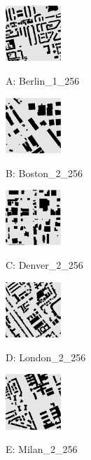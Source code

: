 \documentclass[letterpaper, 10 pt, journal, twoside]{IEEEtran}
\begin{document}
\begin{figure}[t] \scriptsize
\begin{minipage}{.24\linewidth}
  \centerline{\includegraphics[width=2.1cm]{Berlin_1_256.png}}
  \centerline{A: Berlin\_1\_256}
\end{minipage}
\hfill
\begin{minipage}{.24\linewidth}
  \centerline{\includegraphics[width=2.1cm]{Boston_2_256.png}}
  \centerline{B: Boston\_2\_256}
\end{minipage}
\hfill
\begin{minipage}{.24\linewidth}
  \centerline{\includegraphics[width=2.1cm]{Denver_2_256.png}}
  \centerline{C: Denver\_2\_256}
\end{minipage}
\hfill
\begin{minipage}{.24\linewidth}
  \centerline{\includegraphics[width=2.1cm]{London_2_256.png}}
  \centerline{D: London\_2\_256}
\end{minipage}
\vfill
\vspace{0.2cm}
\begin{minipage}{.24\linewidth}
  \centerline{\includegraphics[width=2.1cm]{Milan_2_256.png}}
  \centerline{E: Milan\_2\_256}
\end{minipage}

\end{figure}
\end{document}
